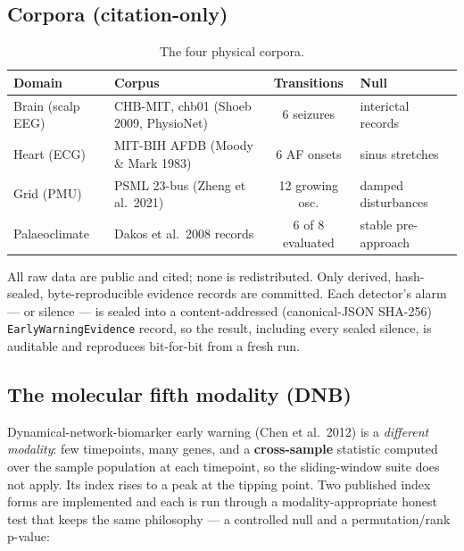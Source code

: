 \documentclass[11pt]{article}
\newcommand{\code}[1]{\texttt{#1}}
\begin{document}
\subsection{Corpora (citation-only)}

\begin{table}[h!]
\centering
\small
\setlength{\tabcolsep}{4pt}
\begin{tabular}{llcl}
\toprule
Domain & Corpus & Transitions & Null \\
\midrule
Brain (scalp EEG) & CHB-MIT, chb01 (Shoeb 2009, PhysioNet) & 6 seizures & interictal records \\
Heart (ECG) & MIT-BIH AFDB (Moody \& Mark 1983) & 6 AF onsets & sinus stretches \\
Grid (PMU) & PSML 23-bus (Zheng et al.\ 2021) & 12 growing osc. & damped disturbances \\
Palaeoclimate & Dakos et al.\ 2008 records & 6 of 8 evaluated & stable pre-approach \\
\bottomrule
\end{tabular}
\caption{The four physical corpora.}
\end{table}

All raw data are public and cited; none is redistributed. Only derived,
hash-sealed, byte-reproducible evidence records are committed. Each
detector's alarm --- or silence --- is sealed into a content-addressed
(canonical-JSON SHA-256) \code{EarlyWarningEvidence} record, so the
result, including every sealed silence, is auditable and reproduces
bit-for-bit from a fresh run.

\subsection{The molecular fifth modality (DNB)}

Dynamical-network-biomarker early warning (Chen et al.\ 2012) is a
\emph{different modality}: few timepoints, many genes, and a
\textbf{cross-sample} statistic computed over the sample population at
each timepoint, so the sliding-window suite does not apply. Its index
rises to a peak at the tipping point. Two published index forms are
implemented and each is run through a modality-appropriate honest test
that keeps the same philosophy --- a controlled null and a
permutation/rank p-value:
\end{document}

